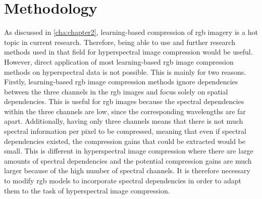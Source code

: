 \chapter{Methodology\label{cha:chapter4}}
As discussed in \autoref{cha:chapter2}, learning-based compression of \ac{rgb} imagery is a hot topic in current research. Therefore, being able to use and further research methods used in that field for hyperspectral image compression would be useful. However, direct application of most learning-based \ac{rgb} image compression methods on hyperspectral data is not possible. This is mainly for two reasons. Firstly, learning-based \ac{rgb} image compression methods ignore dependencies between the three channels in the \ac{rgb} images and focus solely on spatial dependencies. This is useful for \ac{rgb} images because the spectral dependencies within the three channels are low, since the corresponding wavelengths are far apart. Additionally, having only three channels means that there is not much spectral information per pixel to be compressed, meaning that even if spectral dependencies existed, the compression gains that could be extracted would be small. This is different in hyperspectral image compression where there are large amounts of spectral dependencies and the potential compression gains are much larger because of the high number of spectral channels. It is therefore necessary to modify \ac{rgb} models to incorporate spectral dependencies in order to adapt them to the task of hyperspectral image compression. 

